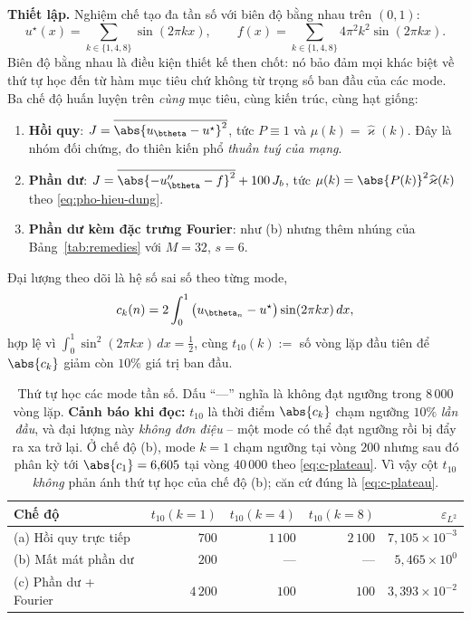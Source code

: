 \textbf{Thiết lập.} Nghiệm chế tạo đa tần số với biên độ bằng nhau trên $(0,1)$:
\begin{equation}
u^{\star}(x) = \sum_{k \in \{1,4,8\}} \sin(2\pi k x),
\qquad
f(x) = \sum_{k \in \{1,4,8\}} 4\pi^2 k^2 \sin(2\pi k x).
\label{eq:da-tan-so}
\end{equation}
Biên độ bằng nhau là điều kiện thiết kế then chốt: nó bảo đảm mọi khác biệt về
thứ tự học đến từ hàm mục tiêu chứ không từ trọng số ban đầu của các mode. Ba chế
độ huấn luyện trên \emph{cùng} mục tiêu, cùng kiến trúc, cùng hạt giống:
 
\begin{enumerate}[label=(\alph*),leftmargin=2.2em,itemsep=2pt]
\item \textbf{Hồi quy}: $J = \overline{\abs{u_{\btheta} - u^{\star}}^2}$, tức
$P \equiv 1$ và $\mu(k) = \widehat{\varkappa}(k)$. Đây là nhóm đối chứng, đo
thiên kiến phổ \emph{thuần tuý của mạng}.
\item \textbf{Phần dư}: $J = \overline{\abs{-u_{\btheta}'' - f}^2} + 100\,J_b$,
tức $\mu(k) = \abs{P(k)}^2\widehat{\varkappa}(k)$ theo
\eqref{eq:pho-hieu-dung}.
\item \textbf{Phần dư kèm đặc trưng Fourier}: như (b) nhưng thêm nhúng của
Bảng~\ref{tab:remedies} với $M = 32$, $s = 6$.
\end{enumerate}
 
Đại lượng theo dõi là hệ số sai số theo từng mode,
\begin{equation}
c_k(n) = 2\int_0^1 \big(u_{\btheta_n} - u^{\star}\big)\sin(2\pi k x)\,dx,
\label{eq:he-so-mode}
\end{equation}
hợp lệ vì $\int_0^1\sin^2(2\pi kx)\,dx = \tfrac12$, cùng
$t_{10}(k) :=$ số vòng lặp đầu tiên để $\abs{c_k}$ giảm còn $10\%$ giá trị ban
đầu.
 
\begin{table}[H]
\centering
\caption[Thứ tự học các mode tần số]{Thứ tự học các mode tần số. Dấu ``---''
nghĩa là không đạt ngưỡng trong $8\,000$ vòng lặp. \textbf{Cảnh báo khi đọc:}
$t_{10}$ là thời điểm $\abs{c_k}$ chạm ngưỡng $10\%$ \emph{lần đầu}, và đại
lượng này \emph{không đơn điệu} -- một mode có thể đạt ngưỡng rồi bị đẩy ra xa
trở lại. Ở chế độ (b), mode $k=1$ chạm ngưỡng tại vòng $200$ nhưng sau đó phân
kỳ tới $\abs{c_1} = 6{,}605$ tại vòng $40\,000$ theo \eqref{eq:c-plateau}. Vì
vậy cột $t_{10}$ \emph{không} phản ánh thứ tự học của chế độ (b); căn cứ đúng là
\eqref{eq:c-plateau}.}
\label{tab:tn3}
\small
\begin{tabular}{@{}lrrrr@{}}
\toprule
\textbf{Chế độ} & $t_{10}(k{=}1)$ & $t_{10}(k{=}4)$ & $t_{10}(k{=}8)$
& $\varepsilon_{L^2}$ \\
\midrule
(a) Hồi quy trực tiếp   & $700$    & $1\,100$ & $2\,100$
                        & $7{,}105\times10^{-3}$ \\
(b) Mất mát phần dư     & $200$    & ---      & ---
                        & $5{,}465\times10^{0}$ \\
(c) Phần dư + Fourier   & $4\,200$ & $100$    & $100$
                        & $3{,}393\times10^{-2}$ \\
\bottomrule
\end{tabular}
\end{table}
 
